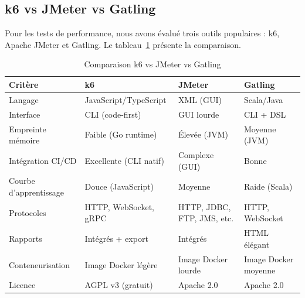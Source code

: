 \subsection{k6 vs JMeter vs Gatling}
\label{subsec:k6-vs-jmeter}

Pour les tests de performance, nous avons évalué trois outils populaires : k6, Apache JMeter et Gatling. Le tableau~\ref{tab:k6-vs-jmeter} présente la comparaison.

\begin{table}[H]
\centering
\caption{Comparaison k6 vs JMeter vs Gatling}
\label{tab:k6-vs-jmeter}
\renewcommand{\arraystretch}{1.3}
\begin{tabularx}{\textwidth}{|l|X|X|X|}
\hline
\rowcolor{speedlineBlue!15}
\textbf{Critère} & \textbf{k6} & \textbf{JMeter} & \textbf{Gatling} \\
\hline
Langage & JavaScript/TypeScript & XML (GUI) & Scala/Java \\
\hline
Interface & CLI (code-first) & GUI lourde & CLI + DSL \\
\hline
Empreinte mémoire & Faible (Go runtime) & Élevée (JVM) & Moyenne (JVM) \\
\hline
Intégration CI/CD & Excellente (CLI natif) & Complexe (GUI) & Bonne \\
\hline
Courbe d'apprentissage & Douce (JavaScript) & Moyenne & Raide (Scala) \\
\hline
Protocoles & HTTP, WebSocket, gRPC & HTTP, JDBC, FTP, JMS, etc. & HTTP, WebSocket \\
\hline
Rapports & Intégrés + export & Intégrés & HTML élégant \\
\hline
Conteneurisation & Image Docker légère & Image Docker lourde & Image Docker moyenne \\
\hline
Licence & AGPL v3 (gratuit) & Apache 2.0 & Apache 2.0 \\
\hline
\end{tabularx}
\end{table}

